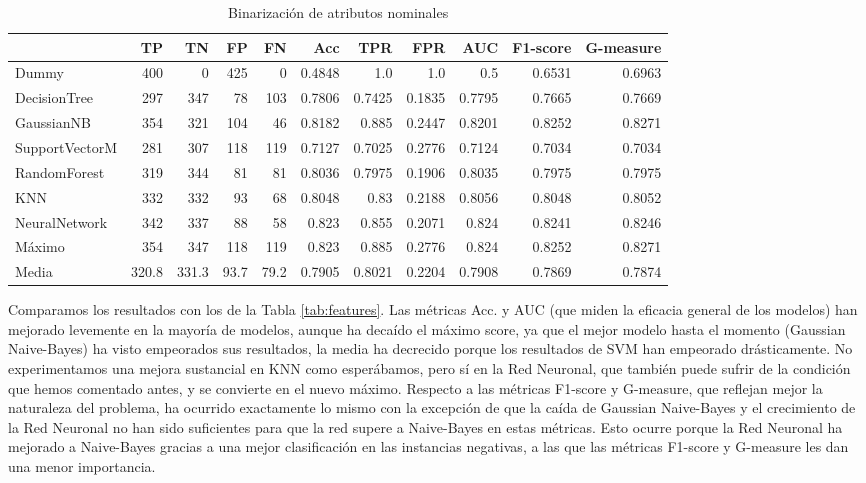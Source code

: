 \documentclass{article}
\begin{document}
\begin{table}[H]
\centering
\caption{Binarización de atributos nominales}
\label{tab:binarization}
\begin{tabular}{|lrrrrrrrrrr|}
\hline
 & TP & TN & FP & FN & Acc & TPR & FPR & AUC & F1-score & G-measure\\ \hline
Dummy & 400 & 0 & 425 & 0 & 0.4848 & 1.0 & 1.0 & 0.5 & 0.6531 & 0.6963\\
DecisionTree & 297 & 347 & 78 & 103 & 0.7806 & 0.7425 & 0.1835 & 0.7795 & 0.7665 & 0.7669\\
GaussianNB & 354 & 321 & 104 & 46 & 0.8182 & 0.885 & 0.2447 & 0.8201 & 0.8252 & 0.8271\\
SupportVectorM & 281 & 307 & 118 & 119 & 0.7127 & 0.7025 & 0.2776 & 0.7124 & 0.7034 & 0.7034\\
RandomForest & 319 & 344 & 81 & 81 & 0.8036 & 0.7975 & 0.1906 & 0.8035 & 0.7975 & 0.7975\\
KNN & 332 & 332 & 93 & 68 & 0.8048 & 0.83 & 0.2188 & 0.8056 & 0.8048 & 0.8052\\
NeuralNetwork & 342 & 337 & 88 & 58 & 0.823 & 0.855 & 0.2071 & 0.824 & 0.8241 & 0.8246\\ \hline
Máximo & 354 & 347 & 118 & 119 & 0.823 & 0.885 & 0.2776 & 0.824 & 0.8252 & 0.8271\\
Media & 320.8 & 331.3 & 93.7 & 79.2 & 0.7905 & 0.8021 & 0.2204 & 0.7908 & 0.7869 & 0.7874\\
\hline
\end{tabular}
\end{table}

Comparamos los resultados con los de la Tabla \ref{tab:features}. Las
métricas Acc. y AUC (que miden la eficacia general de los modelos) han
mejorado levemente en la mayoría de modelos, aunque ha decaído el
máximo score, ya que el mejor modelo hasta el momento (Gaussian
Naive-Bayes) ha visto empeorados sus resultados, la media ha decrecido
porque los resultados de SVM han empeorado drásticamente. No
experimentamos una mejora sustancial en KNN como esperábamos, pero sí
en la Red Neuronal, que también puede sufrir de la condición que hemos
comentado antes, y se convierte en el nuevo máximo. Respecto a las
métricas F1-score y G-measure, que reflejan mejor la naturaleza del
problema, ha ocurrido exactamente lo mismo con la excepción de que la
caída de Gaussian Naive-Bayes y el crecimiento de la Red Neuronal no
han sido suficientes para que la red supere a Naive-Bayes en estas
métricas. Esto ocurre porque la Red Neuronal ha mejorado a Naive-Bayes
gracias a una mejor clasificación en las instancias negativas, a las
que las métricas F1-score y G-measure les dan una menor importancia.
\end{document}
